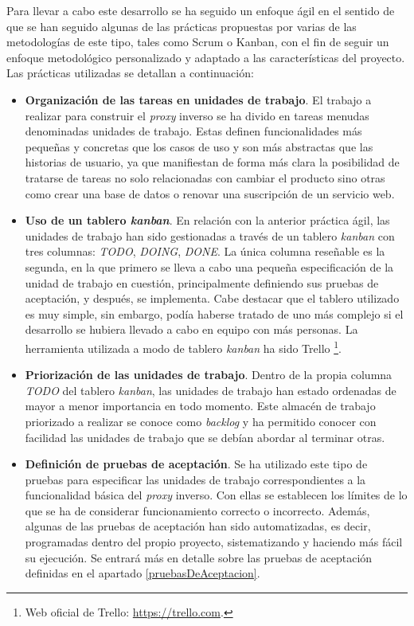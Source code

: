 \documentclass[11pt,spanish,listoffigures]{tfgetsinf}
\begin{document}
Para llevar a cabo este desarrollo se ha seguido un enfoque ágil en el sentido de que se han seguido algunas de las prácticas propuestas por varias de las metodologías de este tipo, tales como Scrum o Kanban, con el fin de seguir un enfoque metodológico personalizado y adaptado a las características del proyecto. Las prácticas utilizadas se detallan a continuación:

\begin{itemize}

	\item \textbf{Organización de las tareas en unidades de trabajo}. El trabajo a realizar para construir el \emph{proxy} inverso se ha divido en tareas menudas denominadas unidades de trabajo. Estas definen funcionalidades más pequeñas y concretas que los casos de uso y son más abstractas que las historias de usuario, ya que manifiestan de forma más clara la posibilidad de tratarse de tareas no solo relacionadas con cambiar el producto sino otras como crear una base de datos o renovar una suscripción de un servicio web.

	\item \textbf{Uso de un tablero \emph{kanban}}. En relación con la anterior práctica ágil, las unidades de trabajo han sido gestionadas a través de un tablero \emph{kanban} con tres columnas: \emph{TODO}, \emph{DOING}, \emph{DONE}. La única columna reseñable es la segunda, en la que primero se lleva a cabo una pequeña especificación de la unidad de trabajo en cuestión, principalmente definiendo sus pruebas de aceptación, y después, se implementa. Cabe destacar que el tablero utilizado es muy simple, sin embargo, podía haberse tratado de uno más complejo si el desarrollo se hubiera llevado a cabo en equipo con más personas. La herramienta utilizada a modo de tablero \emph{kanban} ha sido Trello \footnote{Web oficial de Trello: \url{https://trello.com}.}.

	\item \textbf{Priorización de las unidades de trabajo}. Dentro de la propia columna \emph{TODO} del tablero \emph{kanban}, las unidades de trabajo han estado ordenadas de mayor a menor importancia en todo momento. Este almacén de trabajo priorizado a realizar se conoce como \emph{backlog} y ha permitido conocer con facilidad las unidades de trabajo que se debían abordar al terminar otras.

	\item \textbf{Definición de pruebas de aceptación}. Se ha utilizado este tipo de pruebas para especificar las unidades de trabajo correspondientes a la funcionalidad básica del \emph{proxy} inverso. Con ellas se establecen los límites de lo que se ha de considerar funcionamiento correcto o incorrecto. Además, algunas de las pruebas de aceptación han sido automatizadas, es decir, programadas dentro del propio proyecto, sistematizando y haciendo más fácil su ejecución. Se entrará más en detalle sobre las pruebas de aceptación definidas en el apartado \ref{pruebasDeAceptacion}.


\end{itemize}
\end{document}

